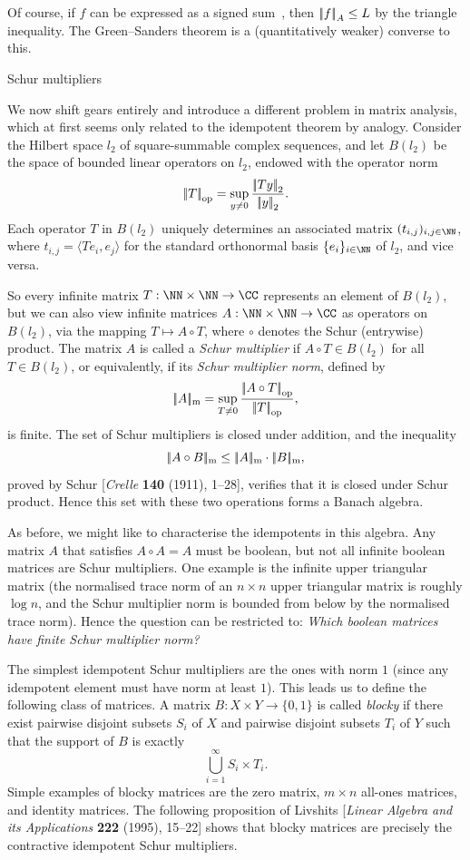 Of course, if $f$ can be expressed as a signed sum~, then $\left|\!\left|f\right|\!\right|_A\le L$
by the triangle inequality. The Green--Sanders theorem is a (quantitatively weaker) converse to this.

\advsect Schur multipliers

We now shift gears entirely and introduce a different problem in matrix analysis, which at first seems
only related to the idempotent theorem by analogy.
Consider the Hilbert space $l_2$ of square-summable complex sequences, and let
$B(l_2)$ be the space of bounded linear operators on $l_2$, endowed with the operator norm
$$\left|\!\left|T\right|\!\right|_{\rm op} = \sup_{y\ne 0} {\left|\!\left|Ty\right|\!\right|_2\over \left|\!\left|y\right|\!\right|_2}.$$
Each operator $T$ in $B(l_2)$ uniquely determines an associated matrix $(t_{i,j})_{i,j\in \NN}$,
where $t_{i,j} = \langle Te_i, e_j\rangle$ for the standard orthonormal basis $\{e_i\}_{i\in \NN}$
of $l_2$, and vice versa.

So every infinite matrix $T:\NN\times\NN\to\CC$ represents an element of $B(l_2)$, but we can also
view infinite matrices $A:\NN\times\NN\to\CC$ as operators on $B(l_2)$, via the mapping
$T\mapsto A\circ T$, where $\circ$ denotes the Schur (entrywise) product. The matrix $A$ is called
a {\it Schur multiplier} if $A\circ T\in B(l_2)$ for all $T\in B(l_2)$, or equivalently, if
its {\it Schur multiplier norm}, defined by
$$|\!|A|\!|_{\rm m} = \sup_{T\ne 0} {\left|\!\left|A\circ T\right|\!\right|_{\rm op}\over \left|\!\left|T\right|\!\right|_{\rm op}},$$
is finite.
The set of Schur multipliers is closed under addition, and the inequality
$$|\!|A\circ B|\!|_{\rm m} \le |\!|A|\!|_{\rm m} \cdot |\!|B|\!|_{\rm m},$$
proved by Schur [{\sl Crelle} {\bf 140} (1911), 1--28],
verifies that it is closed under Schur product.
Hence this set with these two operations forms a Banach algebra.

As before, we might like to characterise the idempotents in this algebra. Any matrix $A$ that
satisfies $A\circ A = A$ must be boolean, but not all infinite boolean matrices are Schur multipliers.
One example is the infinite upper triangular matrix (the normalised
trace norm of an $n\times n$ upper triangular matrix is roughly $\log n$, and the Schur multiplier
norm is bounded from below by the normalised trace norm).
Hence the question can be restricted to: {\sl Which boolean matrices have finite Schur multiplier norm?}

The simplest idempotent Schur multipliers are the ones with norm $1$ (since any idempotent element
must have norm at least $1$). This leads us to define the following class of matrices. A matrix
$B:X\times Y\to \{0,1\}$ is called {\it blocky} if there exist pairwise disjoint subsets $S_i$ of $X$
and pairwise disjoint subsets $T_i$ of $Y$ such that the support of $B$ is exactly
$$\bigcup_{i=1}^\infty S_i \times T_i.$$
Simple examples of blocky matrices are the zero matrix, $m\times n$ all-ones matrices, and identity matrices.
The following proposition of Livshits [{\sl Linear Algebra and its Applications} {\bf 222} (1995), 15--22]
shows that blocky matrices are precisely the contractive idempotent Schur multipliers.


